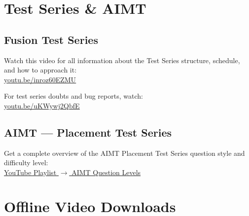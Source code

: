 \documentclass[12pt, a4paper]{article}
\newcommand{\pflink}[2]{\href{#1}{\textcolor{pfTeal}{\underline{#2}}}}
\begin{document}
\section{Test Series \& AIMT}

\subsection{\faClipboardList\enspace Fusion Test Series}

\begin{infobox}
  \small
  Watch this video for all information about the Test Series structure,
  schedule, and how to approach it:\\[4pt]
  \pflink{https://youtu.be/inroz60EZMU?si=QycCbYVmwe6eeNH3}%
         {youtu.be/inroz60EZMU}

  \vspace{6pt}
  For test series doubts and bug reports, watch:\\
  \pflink{https://youtu.be/uKWywj2QbfE?si=HBqAVgk6pkMc2PlS}%
         {youtu.be/uKWywj2QbfE}
\end{infobox}

\subsection{\faTrophy\enspace AIMT — Placement Test Series}

\begin{infobox}
  \small
  Get a complete overview of the AIMT Placement Test Series question style
  and difficulty level:\\[4pt]
  \pflink{https://youtube.com/playlist?list=PLgF7lRh8Xb_XxXA_frTaDRP-NRkQnnMns}%
         {YouTube Playlist $\to$ AIMT Question Levels}
\end{infobox}

\section{Offline Video Downloads}
\end{document}
